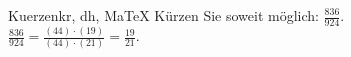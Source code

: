 \begin{MAufgabe}{Kuerzen}{kr, dh, MaTeX}
K\"urzen Sie soweit m\"oglich: $\frac{836}{924}$.\\ 
\ifLsg\MLoesung
\quad $\frac{836}{924}=\frac{(44)\cdot(19)}{(44)\cdot(21)}=\frac{19}{21}$.\else\relax\fi
 \end{MAufgabe}